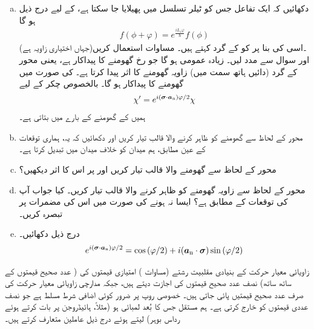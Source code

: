 \begin{enumerate}[a.]
\item
 دکھائیں کہ ایک تفاعل  جس کو ٹیلر تسلسل میں پھیلایا جا سکتا ہے، کے لیے درج ذیل ہو گا 
\begin{align*}
 f(\phi+\varphi)= e^{\frac{i L_z\varphi}{\hslash}}f(\phi)
\end{align*} 
(جہاں  اختیاری زاویہ ہے)۔اسی کی بنا پر  کو  کے گرد  کہتے ہیں۔ مساوات  استعمال کریں اور سوال  سے مدد لیں۔ زیادہ عمومی  ہو گا جو  رخ گھومنے کا پیداکار ہے، 
 یعنی  محور  کے گرد (دائیں ہاتھ سمت میں) زاویہ  گھومنے کا اثر پیدا کرتا ہے۔  کی صورت میں گھومنے کا پیداکار  ہو گا۔ بالخصوص  چکر کے لیے
\begin{align}
 \chi'=e^{i({{\boldsymbol{\sigma}}}\cdot {\ensuremath{{\boldsymbol{a}}}_{\textup{n}}})\varphi/2}\chi
\end{align}
 ہمیں  کے گھومنے کے بارے میں بتاتی ہے۔ 
\item
 محور  کے لحاظ سے گھومنے کو ظاہر کرنے والا  قالب تیار کریں اور دکھائیں کہ یہ، ہماری توقعات کے عین مطابق، ہم میدان  کو خلاف میدان  میں تبدیل کرتا ہے۔ 
\item
 محور  کے لحاظ سے گھومنے والا قالب تیار کریں اور  پر اس کا اثر دیکھیں؟ 
\item
 محور  کے لحاظ سے  زاویہ گھومنے کو ظاہر کرنے والا قالب تیار کریں۔ کیا جواب آپ کی توقعات کے مطابق ہے؟ ایسا نہ ہونے کی صورت میں اس کی مضمرات پر تبصرہ کریں۔
\item
 درج ذیل دکھائیں۔
\begin{align} e^{i({{\boldsymbol{\sigma}}}\cdot {\ensuremath{{\boldsymbol{a}}}_{\textup{n}}})\varphi/2}=\cos{(\varphi/2)}+i({{\boldsymbol{a}}_{\textup{n}}}\cdot {\ensuremath{{\boldsymbol{\sigma}}}})\sin{(\varphi/2)}
\end{align}
\end{enumerate}
زاویائی معیار حرکت کے بنیادی مقلبیت رشتے (مساوات ) امتیازی  قیمتوں  کی ( عدد صحیح قیمتوں کے ساتھ ساتھ) نصف عدد صحیح قیمتوں کی اجازت دیتے ہیں، جبکہ مدارچی زاویائی معیار حرکت کی صرف عدد صحیح قیمتیں پائی جاتی ہیں۔ خصوصی روپ  پر ضرور کوئی اضافی شرط مسلط ہے جو نصف عددی قیمتوں کو خارج کرتی ہے۔ ہم مستقل  جس کا بُعد لمبائی ہو (مثلاً، ہائیڈروجن پر بات کرتے ہوئے رداس بوہر) لیتے ہوئے درج ذیل عاملین متعارف کرتے ہیں۔

